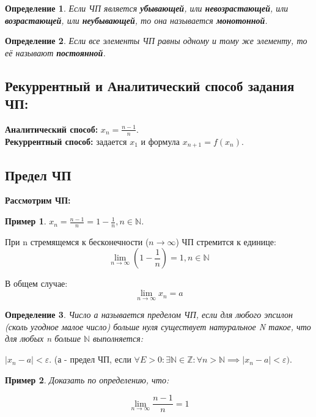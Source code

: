 \documentclass[12pt, a4paper]{article}
\newtheorem{definition}{Определение}[subsection]
\newtheorem{example}{Пример}[subsection]
\theoremstyle{remark}
\newcommand{\N}{\mathbb{N}}
\newcommand{\Z}{\mathbb{Z}}
\newcommand{\Y}{\mathbb{\forall}}
\newcommand{\F}{\mathbb{\exists}}
\newcommand{\E}{\mathbb{\varepsilon}}
\begin{document}
	\begin{definition}
		Если ЧП является \textbf{убывающей}, или \textbf{невозрастающей}, или \textbf{возрастающей}, или \textbf{неубывающей}, то она называется \textbf{монотонной}.
	\end{definition}
	
	\begin{definition}
		Если все элементы ЧП равны одному и тому же элементу, то её называют \textbf{постоянной}.
	\end{definition}
	
	\subsection{Рекуррентный и Аналитический способ задания ЧП:}
	
	\textbf{Аналитический способ:} \(x_n = \frac{n-1}{n}\). \\
	\textbf{Рекуррентный способ:} задается \(x_1\) и формула \(x_{n+1} = f(x_n)\).
	
	\subsection{Предел ЧП}
	
	\textbf{Рассмотрим ЧП:}
	
	\begin{example}
		$x_n = \frac{n-1}{n} = 1 - \frac{1}{n}, n \in \N$.
	\end{example}
	
	При n стремящемся к бесконечности ($n \to \infty$) ЧП стремится к единице:
	\[
	\lim_{n \to \infty} \left(1 - \frac{1}{n}\right) = 1, n \in \N
	\]
	
	В общем случае: 
	\[
	\lim_{n \to \infty} x_n = a
	\]
	
	\begin{definition}
		Число а называется пределом ЧП, если для любого эпсилон (сколь угодное малое число) больше нуля существует натуральное N такое, что для любых n больше $\N$ выполняется: 
	\end{definition}
	
	$|x_n - a| < \E$. (а - предел ЧП, если $\Y E > 0:\F\N \in \Z: \Y n > \N \implies |x_n - a| < \E)$.
	
	\newpage
	\begin{example}
		Доказать по определению, что:
	\end{example}
	
	\[
	\lim_{n \to \infty} \frac{n-1}{n} = 1
	\]
	
\end{document}

